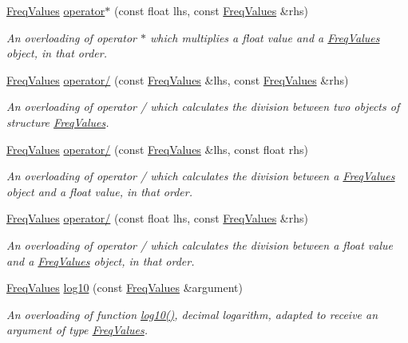\begin{DoxyCompactItemize}
\hyperlink{structFreqValues}{Freq\+Values} \hyperlink{structFreqValues_ab9bb62425b97f45a5eb485cf745bfe4a}{operator$\ast$} (const float lhs, const \hyperlink{structFreqValues}{Freq\+Values} \&rhs)
\begin{DoxyCompactList}\small\item\em An overloading of operator $\ast$ which multiplies a {\itshape float} value and a {\itshape \hyperlink{structFreqValues}{Freq\+Values}} object, in that order. \end{DoxyCompactList}\item 
\hyperlink{structFreqValues}{Freq\+Values} \hyperlink{structFreqValues_a26f13922dd72ad292bea45072abc2c96}{operator/} (const \hyperlink{structFreqValues}{Freq\+Values} \&lhs, const \hyperlink{structFreqValues}{Freq\+Values} \&rhs)
\begin{DoxyCompactList}\small\item\em An overloading of operator / which calculates the division between two objects of structure {\itshape \hyperlink{structFreqValues}{Freq\+Values}}. \end{DoxyCompactList}\item 
\hyperlink{structFreqValues}{Freq\+Values} \hyperlink{structFreqValues_a392b5ed122a4deafa3ba773f4829c20a}{operator/} (const \hyperlink{structFreqValues}{Freq\+Values} \&lhs, const float rhs)
\begin{DoxyCompactList}\small\item\em An overloading of operator / which calculates the division between a {\itshape \hyperlink{structFreqValues}{Freq\+Values}} object and a {\itshape float} value, in that order. \end{DoxyCompactList}\item 
\hyperlink{structFreqValues}{Freq\+Values} \hyperlink{structFreqValues_aed1d809f52aa8f6da3afa2af8a45d288}{operator/} (const float lhs, const \hyperlink{structFreqValues}{Freq\+Values} \&rhs)
\begin{DoxyCompactList}\small\item\em An overloading of operator / which calculates the division between a {\itshape float} value and a {\itshape \hyperlink{structFreqValues}{Freq\+Values}} object, in that order. \end{DoxyCompactList}\item 
\hyperlink{structFreqValues}{Freq\+Values} \hyperlink{structFreqValues_a90781867604621a99e59d4fcdc4a5f38}{log10} (const \hyperlink{structFreqValues}{Freq\+Values} \&argument)
\begin{DoxyCompactList}\small\item\em An overloading of function {\ttfamily \hyperlink{structFreqValues_a90781867604621a99e59d4fcdc4a5f38}{log10()}}, decimal logarithm, adapted to receive an argument of type {\itshape \hyperlink{structFreqValues}{Freq\+Values}}. \end{DoxyCompactList}\item 

\end{DoxyCompactItemize}
